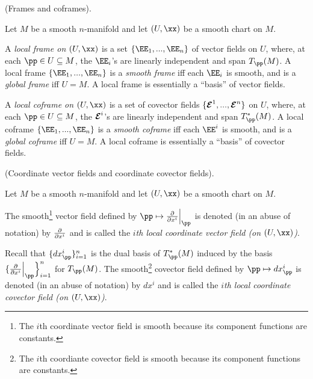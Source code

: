 \begin{defn}
     (Frames and coframes).
    
    Let $M$ be a smooth $n$-manifold and let $(U, \xx)$ be a smooth chart on $M$.
    
    A \textit{local frame on $(U, \xx)$} is a set $\{\EE_1, ..., \EE_n\}$ of vector fields on $U$, where, at each $\pp \in U \subseteq M$, the $\EE_i$'s are linearly independent and span $T_\pp(M)$. A local frame $\{\EE_1, ..., \EE_n\}$ is a \textit{smooth frame} iff each $\EE_i$ is smooth, and is a \textit{global frame} iff $U = M$. A local frame is essentially a ``basis'' of vector fields.
    
    A \textit{local coframe on $(U, \xx)$} is a set of covector fields $\{\boldsymbol{\mathcal{E}}^1, ..., \boldsymbol{\mathcal{E}}^n\}$ on $U$, where, at each $\pp \in U \subseteq M$, the $\boldsymbol{\mathcal{E}}^i$'s are linearly independent and span $T_\pp^*(M)$. A local coframe $\{\EE_1, ..., \EE_n\}$ is a \textit{smooth coframe} iff each $\EE^i$ is smooth, and is a \textit{global coframe} iff $U = M$. A local coframe is essentially a ``basis'' of covector fields.
\end{defn}

\begin{defn}
     (Coordinate vector fields and coordinate covector fields).
    
    Let $M$ be a smooth $n$-manifold and let  $(U, \xx)$ be a smooth chart on $M$.
    
    The smooth\footnote{The $i$th coordinate vector field is smooth because its component functions are constants.} vector field defined by $\pp \mapsto \frac{\pd}{\pd x^i}\Big|_\pp$ is denoted (in an abuse of notation) by $\frac{\partial}{\partial x^i}$ and is called the \textit{$i$th local coordinate vector field (on $(U, \xx)$)}. 
    
    Recall that $\{ dx^i_\pp \}_{i = 1}^n$ is the dual basis of $T_\pp^*(M)$ induced by the basis $\{ \frac{\pd}{\pd x^i}\Big|_\pp \Big\}_{i = 1}^n$ for $T_\pp(M)$. The smooth\footnote{The $i$th coordiante covector field is smooth because its component functions are constants.} covector field defined by $\pp \mapsto dx^i_\pp$ is denoted (in an abuse of notation) by $dx^i$ and is called the \textit{$i$th local coordinate covector field (on $(U, \xx)$)}.
\end{defn}

